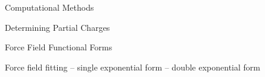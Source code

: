 \begin{section}{Computational Methods}
\label{sec:lmoeda-methods}

Determining Partial Charges

Force Field Functional Forms

Force field fitting
    -- single exponential form
    -- double exponential form



\end{section}
